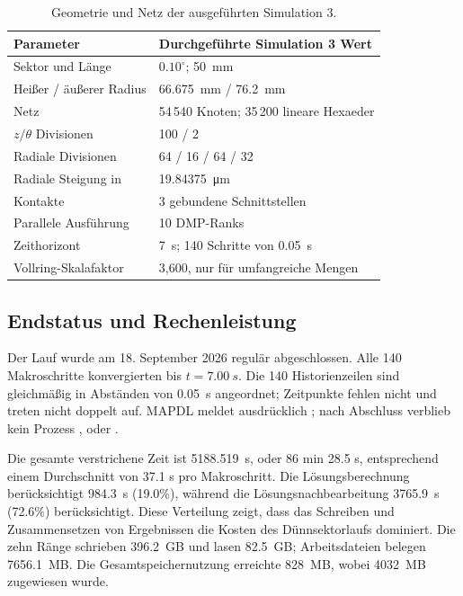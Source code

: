 \documentclass[oneside,openany]{amsdtx}
\begin{document}
\begin{table}[H]
\centering
\small
\renewcommand{\arraystretch}{1.15}
\begin{tabular}{L{0.43\textwidth}L{0.43\textwidth}}
\toprule
\textbf{Parameter} & \textbf{Durchgeführte Simulation 3 Wert} \\
\midrule
Sektor und Länge & \(0.10^\circ\); \SI{50}{mm} \\
Heißer / äußerer Radius & \SI{66.675}{mm} / \SI{76.2}{mm} \\
Netz & 54\,540 Knoten; 35\,200 lineare Hexaeder \\
\(z/\theta\) Divisionen & 100 / 2 \\
Radiale Divisionen & 64 / 16 / 64 / 32 \\
Radiale Steigung in  & \SI{19.84375}{\micro m} \\
Kontakte & 3 gebundene Schnittstellen \\
Parallele Ausführung & 10 DMP-Ranks \\
Zeithorizont & \SI{7}{s}; 140 Schritte von \SI{0.05}{s} \\
Vollring-Skalafaktor & 3,600, nur für umfangreiche Mengen \\
\bottomrule
\end{tabular}
\caption{Geometrie und Netz der ausgeführten Simulation 3.}
\label{tab:sim3-configuration}
\end{table}

\subsection{Endstatus und Rechenleistung}

Der Lauf wurde am 18. September 2026 regulär abgeschlossen. Alle 140 Makroschritte konvergierten bis \(t=\SI{7.00}{s}\). Die 140 Historienzeilen sind gleichmäßig in Abständen von \SI{0.05}{s} angeordnet; Zeitpunkte fehlen nicht und treten nicht doppelt auf. MAPDL meldet ausdrücklich ; nach Abschluss verblieb kein Prozess ,  oder .

Die gesamte verstrichene Zeit ist \SI{5188.519}{s}, oder 86 min 28.5 s, entsprechend einem Durchschnitt von 37.1 s pro Makroschritt. Die Lösungsberechnung berücksichtigt \SI{984.3}{s} (19.0\%), während die Lösungsnachbearbeitung \SI{3765.9}{s} (72.6\%) berücksichtigt. Diese Verteilung zeigt, dass das Schreiben und Zusammensetzen von Ergebnissen die Kosten des Dünnsektorlaufs dominiert. Die zehn Ränge schrieben \SI{396.2}{GB} und lasen \SI{82.5}{GB}; Arbeitsdateien belegen \SI{7656.1}{MB}. Die Gesamtspeichernutzung erreichte \SI{828}{MB}, wobei \SI{4032}{MB} zugewiesen wurde.
\end{document}
